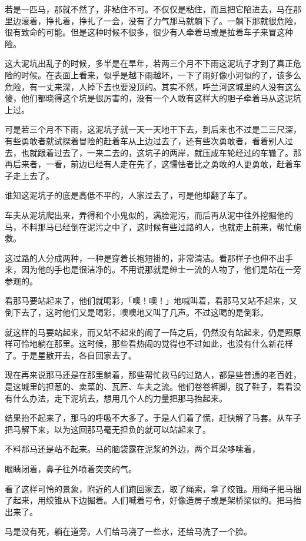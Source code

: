 \documentclass[UTF8]{ctexart}
\begin{document}
若是一匹马，那就不然了，非粘住不可。不仅仅是粘住，而且把它陷进去，马在那里边滚着，挣扎着，挣扎了一会，没有了力气那马就躺下了。一躺下那就很危险，很有致命的可能。但是这种时候不很多，很少有人牵着马或是拉着车子来冒这种险。

这大泥坑出乱子的时候，多半是在旱年，若两三个月不下雨这泥坑子才到了真正危险的时候。在表面上看来，似乎是越下雨越坏，一下了雨好像小河似的了，该多么危险，有一丈来深，人掉下去也要没顶的。其实不然，呼兰河这城里的人没有这么傻，他们都晓得这个坑是很厉害的，没有一个人敢有这样大的胆子牵着马从这泥坑上过。

可是若三个月不下雨，这泥坑子就一天一天地干下去，到后来也不过是二三尺深，有些勇敢者就试探着冒险的赶着车从上边过去了，还有些次勇敢者，看着别人过去，也就跟着过去了，一来二去的，这坑子的两岸，就压成车轮经过的车辙了。那再后来者，一看，前边已经有人走在先了，这懦怯者比之勇敢的人更勇敢，赶着车子走上去了。

谁知这泥坑子的底是高低不平的，人家过去了，可是他却翻了车了。

车夫从泥坑爬出来，弄得和个小鬼似的，满脸泥污，而后再从泥中往外挖掘他的马，不料那马已经倒在泥污之中了，这时候有些过路的人，也就走上前来，帮忙施救。

这过路的人分成两种，一种是穿着长袍短褂的，非常清洁。看那样子也伸不出手来，因为他的手也是很洁净的。不用说那就是绅士一流的人物了，他们是站在一旁参观的。

看那马要站起来了，他们就喝彩，「噢！噢！」地喊叫着，看那马又站不起来，又倒下去了，这时他们又是喝彩，噢噢地又叫了几声。不过这喝的是倒彩。

就这样的马要站起来，而又站不起来的闹了一阵之后，仍然没有站起来，仍是照原样可怜地躺在那里。这时候，那些看热闹的觉得也不过如此，也没有什么新花样了。于是星散开去，各自回家去了。

现在再来说那马还是在那里躺着，那些帮忙救马的过路人，都是些普通的老百姓，是这城里的担葱的、卖菜的、瓦匠、车夫之流。他们卷卷裤脚，脱了鞋子，看看没有什么办法，走下泥坑去，想用几个人的力量把那马抬起来。

结果抬不起来了，那马的呼吸不大多了。于是人们着了慌，赶快解了马套。从车子把马解下来，以为这回那马毫无担负的就可以站起来了。

不料那马还是站不起来。马的脑袋露在泥浆的外边，两个耳朵哆嗦着，

眼睛闭着，鼻子往外喷着突突的气。

看了这样可怜的景象，附近的人们跑回家去，取了绳索，拿了绞锥。用绳子把马捆了起来，用绞锥从下边掘着。人们喊着号令，好像造房子或是架桥梁似的。把马抬出来了。

马是没有死，躺在道旁。人们给马浇了一些水，还给马洗了一个脸。
\end{document}
